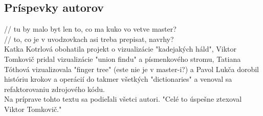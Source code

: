 \subsection{Príspevky autorov}
// tu by malo byt len to, co ma kuko vo vetve master?\\
// to, co je v uvodzovkach asi treba prepisat, navrhy?\\

Katka Kotrlová obohatila projekt o vizualizácie "kadejakých háld", Viktor Tomkovič pridal vizualizácie "union findu" a písmenkového stromu, Tatiana Tóthová vizualizovala "finger tree" (este nie je v master-i?) a Pavol Lukča dorobil históriu krokov a operácií do takmer všetkých "dictionaries" a venoval sa refaktorovaniu zdrojového kódu.\\
Na príprave tohto textu sa podieľali všetci autori. "Celé to úspešne ztexoval Viktor Tomkovič."

